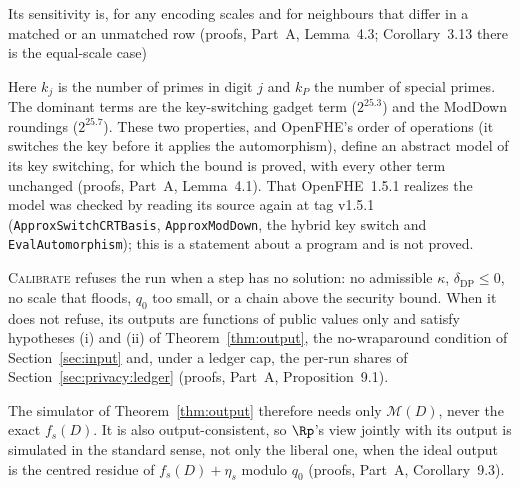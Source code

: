 Its sensitivity is, for any encoding scales and for neighbours that differ in a matched or an unmatched row (proofs, Part~A, Lemma~4.3; Corollary~3.13 there is the equal-scale case)

Here $k_j$ is the number of primes in digit $j$ and $k_P$ the number of special primes. The dominant terms are the key-switching gadget term ($2^{25.3}$) and the ModDown roundings ($2^{25.7}$). These two properties, and OpenFHE's order of operations (it switches the key before it applies the automorphism), define an abstract model of its key switching, for which the bound is proved, with every other term unchanged (proofs, Part~A, Lemma~4.1). That OpenFHE~1.5.1 realizes the model was checked by reading its source again at tag v1.5.1 (\texttt{ApproxSwitchCRTBasis}, \texttt{ApproxModDown}, the hybrid key switch and \texttt{EvalAutomorphism}); this is a statement about a program and is not proved.

\textsc{Calibrate} refuses the run when a step has no solution: no admissible $\kappa$, $\delta_{\mathrm{DP}} \le 0$, no scale that floods, $q_0$ too small, or a chain above the security bound. When it does not refuse, its outputs are functions of public values only and satisfy hypotheses (i) and (ii) of Theorem~\ref{thm:output}, the no-wraparound condition of Section~\ref{sec:input} and, under a ledger cap, the per-run shares of Section~\ref{sec:privacy:ledger} (proofs, Part~A, Proposition~9.1).

The simulator of Theorem~\ref{thm:output} therefore needs only $\mathcal M(D)$, never the exact $f_s(D)$. It is also output-consistent, so $\Rp$'s view jointly with its output is simulated in the standard sense, not only the liberal one, when the ideal output is the centred residue of $f_s(D) + \eta_s$ modulo $q_0$ (proofs, Part~A, Corollary~9.3).

